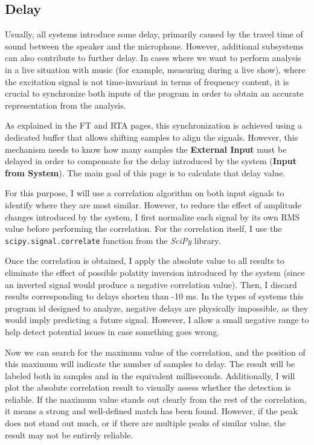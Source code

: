 \subsection{Delay}

Usually, all systems introduce some delay, primarily caused by the travel time of sound between the speaker and the microphone. However, additional subsystems can also contribute to further delay. In cases where we want to perform analysis in a live situation with music (for example, measuring during a live show), where the excitation signal is not time-invariant in terms of frequency content, it is crucial to synchronize both inputs of the program in order to obtain an accurate representation from the analysis.

As explained in the FT and RTA pages, this synchronization is achieved using a dedicated buffer that allows shifting samples to align the signals. However, this mechanism needs to know how many samples the \textbf{External Input} must be delayed in order to compensate for the delay introduced by the system (\textbf{Input from System}). The main goal of this page is to calculate that delay value.

For this purpose, I will use a correlation algorithm on both input signals to identify where they are most similar. However, to reduce the effect of amplitude changes introduced by the system, I first normalize each signal by its own RMS value before performing the correlation. For the correlation itself, I use the \texttt{scipy.signal.correlate} function from the \textit{SciPy} library.

Once the correlation is obtained, I apply the absolute value to all results to eliminate the effect of possible polatity inversion introduced by the system (since an inverted signal would produce a negative correlation value). Then, I discard results corresponding to delays shorten than -10 ms. In the types of systems this program id designed to analyze, negative delays are physically impossible, as they would imply predicting a future signal. However, I allow a small negative range to help detect potential issues in case something goes wrong.

Now we can search for the maximum value of the correlation, and the position of this maximum will indicate the number of samples to delay. The result will be labeled both in samples and in the equivalent milliseconds. Additionally, I will plot the absolute correlation result to visually assess whether the detection is reliable. If the maximum value stands out clearly from the rest of the correlation, it means a strong and well-defined match has been found. However, if the peak does not stand out much, or if there are multiple peaks of similar value, the result may not be entirely reliable.


